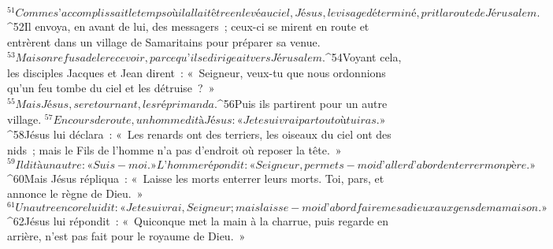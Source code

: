   
  
${}^{51}Comme s’accomplissait le temps où il allait être enlevé au ciel, Jésus, le visage déterminé, prit la route de Jérusalem.
${}^{52}Il envoya, en avant de lui, des messagers ; ceux-ci se mirent en route et entrèrent dans un village de Samaritains pour préparer sa venue. 
${}^{53}Mais on refusa de le recevoir, parce qu’il se dirigeait vers Jérusalem. 
${}^{54}Voyant cela, les disciples Jacques et Jean dirent : « Seigneur, veux-tu que nous ordonnions qu’un feu tombe du ciel et les détruise ? » 
${}^{55}Mais Jésus, se retournant, les réprimanda. 
${}^{56}Puis ils partirent pour un autre village.
${}^{57}En cours de route, un homme dit à Jésus : « Je te suivrai partout où tu iras. » 
${}^{58}Jésus lui déclara : « Les renards ont des terriers, les oiseaux du ciel ont des nids ; mais le Fils de l’homme n’a pas d’endroit où reposer la tête. »
${}^{59}Il dit à un autre : « Suis-moi. » L’homme répondit : « Seigneur, permets-moi d’aller d’abord enterrer mon père. » 
${}^{60}Mais Jésus répliqua : « Laisse les morts enterrer leurs morts. Toi, pars, et annonce le règne de Dieu. »
${}^{61}Un autre encore lui dit : « Je te suivrai, Seigneur ; mais laisse-moi d’abord faire mes adieux aux gens de ma maison. » 
${}^{62}Jésus lui répondit : « Quiconque met la main à la charrue, puis regarde en arrière, n’est pas fait pour le royaume de Dieu. »
      
